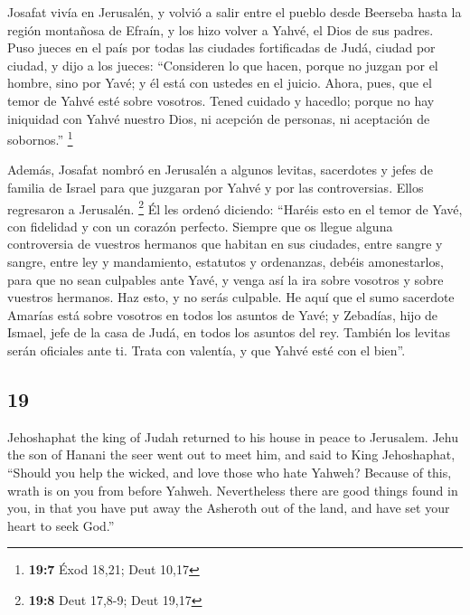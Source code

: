 \begin{paracol}{2}
 Josafat vivía en Jerusalén, y volvió a salir entre el
pueblo desde Beerseba hasta la región montañosa de Efraín, y los hizo
volver a Yahvé, el Dios de sus padres.  Puso jueces en el
país por todas las ciudades fortificadas de Judá, ciudad por ciudad,
 y dijo a los jueces: ``Consideren lo que hacen, porque no
juzgan por el hombre, sino por Yavé; y él está con ustedes en el juicio.
 Ahora, pues, que el temor de Yahvé esté sobre vosotros.
Tened cuidado y hacedlo; porque no hay iniquidad con Yahvé nuestro Dios,
ni acepción de personas, ni aceptación de sobornos.'' \footnote{\textbf{19:7}
  Éxod 18,21; Deut 10,17}

 Además, Josafat nombró en Jerusalén a algunos levitas,
sacerdotes y jefes de familia de Israel para que juzgaran por Yahvé y
por las controversias. Ellos regresaron a Jerusalén. \footnote{\textbf{19:8}
  Deut 17,8-9; Deut 19,17}  Él les ordenó diciendo:
``Haréis esto en el temor de Yavé, con fidelidad y con un corazón
perfecto.  Siempre que os llegue alguna controversia de
vuestros hermanos que habitan en sus ciudades, entre sangre y sangre,
entre ley y mandamiento, estatutos y ordenanzas, debéis amonestarlos,
para que no sean culpables ante Yavé, y venga así la ira sobre vosotros
y sobre vuestros hermanos. Haz esto, y no serás culpable.
 He aquí que el sumo sacerdote Amarías está sobre
vosotros en todos los asuntos de Yavé; y Zebadías, hijo de Ismael, jefe
de la casa de Judá, en todos los asuntos del rey. También los levitas
serán oficiales ante ti. Trata con valentía, y que Yahvé esté con el
bien''.

\switchcolumn
\begin{otherlanguage}{english}

\hypertarget{section-37}{%
\section{19}\label{section-37}}

 Jehoshaphat the king of Judah returned to his house in
peace to Jerusalem.  Jehu the son of Hanani the seer went
out to meet him, and said to King Jehoshaphat, ``Should you help the
wicked, and love those who hate Yahweh? Because of this, wrath is on you
from before Yahweh.  Nevertheless there are good things
found in you, in that you have put away the Asheroth out of the land,
and have set your heart to seek God.''


\end{otherlanguage}
\end{paracol}
